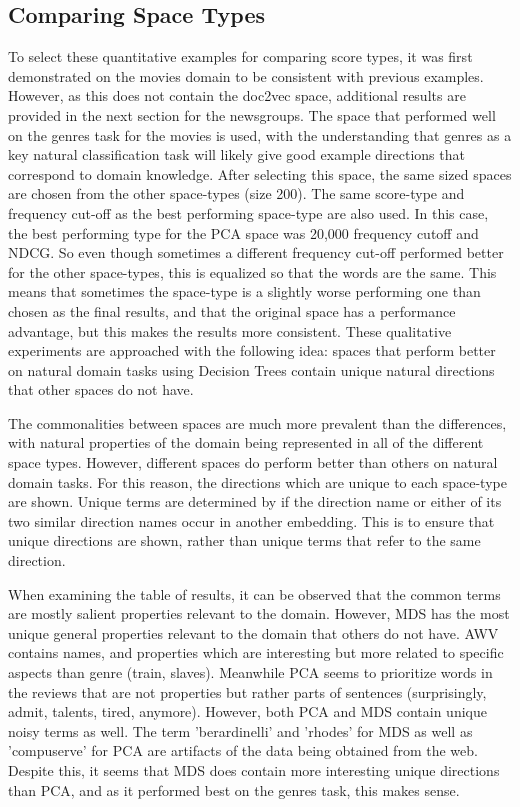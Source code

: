 \subsection{Comparing Space Types}

To select these quantitative examples for  comparing score types, it was first demonstrated on the movies domain to be consistent with previous examples. However, as this does not contain the doc2vec space, additional results are provided in the next section for the newsgroups. The space that performed well on the genres task for the movies is used, with the understanding that genres as a key natural classification task will likely give good example directions that correspond to domain knowledge. After selecting this space, the same sized spaces are chosen from the other space-types (size 200). The same score-type and frequency cut-off  as the best performing space-type are also used. In this case, the best performing type for the PCA space was 20,000 frequency cutoff and NDCG. So even though sometimes a different frequency cut-off performed better for the other space-types, this is equalized so that the words are the same. This means that sometimes the space-type is  a slightly worse performing one than chosen as the final results, and that the original space has a performance advantage, but this makes the results more consistent. These qualitative experiments are approached with the following idea: spaces that perform better on natural domain tasks using Decision Trees contain unique natural directions that other spaces do not have. 

The commonalities between spaces are much more prevalent than the differences, with natural properties of the domain being represented in all of the different space types. However, different spaces do perform better than others on natural domain tasks. For this reason, the directions which are unique to each space-type are shown. Unique terms are determined by if the direction name or either of its two similar direction names occur in another embedding. This is to ensure that unique directions are shown, rather than unique terms that refer to the same direction.

When examining the table of results, it can be observed that the common terms are mostly salient properties relevant to the domain. However, MDS has the most unique general properties relevant to the domain that others do not have. AWV contains names, and properties which are interesting but more related to specific aspects than genre (train, slaves). Meanwhile PCA seems to prioritize words in the reviews that are not properties but rather parts of sentences (surprisingly, admit, talents, tired, anymore). However, both PCA and MDS contain unique noisy terms as well. The term 'berardinelli' and 'rhodes' for MDS as well as 'compuserve' for PCA are artifacts of the data being obtained from the web. Despite this, it seems that MDS does contain more interesting unique directions than PCA, and as it performed best on the genres task, this makes sense.

